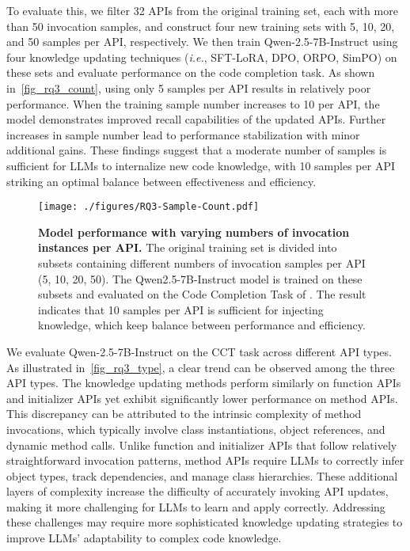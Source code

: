 To evaluate this, we filter 32 APIs from the original training set, each with more than 50 invocation samples, and construct four new training sets with 5, 10, 20, and 50 samples per API, respectively. We then train Qwen-2.5-7B-Instruct using four knowledge updating techniques (\emph{i.e.}, SFT-LoRA, DPO, ORPO, SimPO) on these sets and evaluate performance on the code completion task. As shown in~\autoref{fig_rq3_count}, using only 5 samples per API results in relatively poor performance. When the training sample number increases to 10 per API, the model demonstrates improved recall capabilities of the updated APIs. Further increases in sample number lead to performance stabilization with minor additional gains. These findings suggest that a moderate number of samples is sufficient for LLMs to internalize new code knowledge, with 10 samples per API striking an optimal balance between effectiveness and efficiency.

\begin{figure}[!t]
	\centering
	\texttt{[image: ./figures/RQ3-Sample-Count.pdf]}
         \vspace{-1.5em}
         \caption{\textbf{Model performance with varying numbers of invocation instances per API.}
         The original training set is divided into subsets containing different numbers of invocation samples per API (5, 10, 20, 50). The Qwen2.5-7B-Instruct model is trained on these subsets and evaluated on the Code Completion Task of \benchmark. The result indicates that 10 samples per API is sufficient for injecting knowledge, which keep balance between performance and efficiency.
         }
	\label{fig_rq3_count}
	\vspace{-1em}
\end{figure}

We evaluate Qwen-2.5-7B-Instruct on the CCT task across different API types. As illustrated in~\autoref{fig_rq3_type}, a clear trend can be observed among the three API types. The knowledge updating methods perform similarly on function APIs and initializer APIs yet exhibit significantly lower performance on method APIs. This discrepancy can be attributed to the intrinsic complexity of method invocations, which typically involve class instantiations, object references, and dynamic method calls. Unlike function and initializer APIs that follow relatively straightforward invocation patterns, method APIs require LLMs to correctly infer object types, track dependencies, and manage class hierarchies. These additional layers of complexity increase the difficulty of accurately invoking API updates, making it more challenging for LLMs to learn and apply correctly. Addressing these challenges may require more sophisticated knowledge updating strategies to improve LLMs' adaptability to complex code knowledge.

